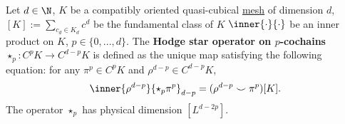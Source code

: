 \begin{definition}
  \label{idec/mesh/quasi_cubical/hodge_star/concept-definition}
  Let
    $d \in \N$,
    $K$ be a compatibly oriented quasi-cubical
    \hyperref[idec:mesh:definition]{mesh} of dimension $d$,
    $[K] := \sum_{c_d \in K_d} c^d$ be the fundamental class of $K$
    $\inner{\cdot}{\cdot}$ be an inner product on $K$,
    $p \in \{0, ..., d\}$.
  The \textbf{Hodge star operator on $p$-cochains}
  $\star_p \colon C^p K \to C^{d - p} K$
  is defined as the unique map satisfying the following equation:
  for any $\pi^p \in C^p K$ and $\rho^{d - p} \in C^{d - p} K$,
  \begin{equation}
    \inner{\rho^{d - p}}{\star_p \pi^p}_{d - p}
    = (\rho^{d - p} \smile \pi^p)[K].
  \end{equation}
  The operator $\star_p$ has physical dimension $[L^{d - 2 p}]$.
\end{definition}
